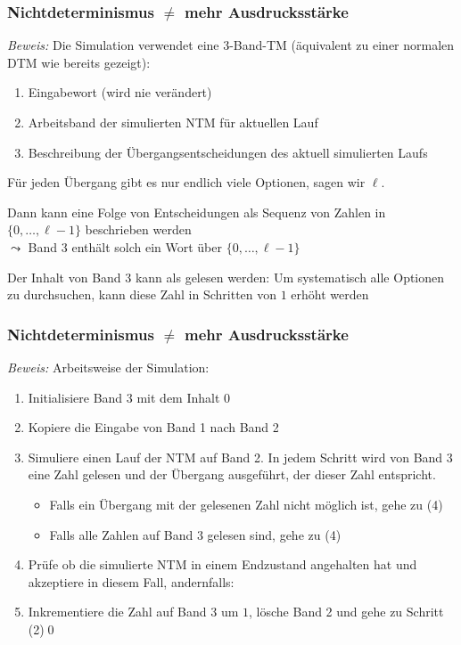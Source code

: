 \documentclass[aspectratio=1610,onlymath]{beamer}
\begin{document}
\begin{frame}[t]\frametitle{Nichtdeterminismus $\neq$ mehr Ausdrucksstärke}

\pause

\emph{Beweis:} Die Simulation verwendet eine 3-Band-TM (äquivalent zu einer normalen DTM wie bereits gezeigt):
\begin{enumerate}
\item Eingabewort (wird nie verändert)
\item Arbeitsband der simulierten NTM für aktuellen Lauf
\item Beschreibung der Übergangsentscheidungen des aktuell simulierten Laufs
\end{enumerate}\pause
Für jeden Übergang gibt es nur endlich viele Optionen, sagen wir $\ell$.\medskip\pause%

Dann kann eine Folge von Entscheidungen als Sequenz von Zahlen in $\{0,\ldots, \ell-1\}$ beschrieben werden\\
$\leadsto$ Band 3 enthält solch ein Wort über $\{0,\ldots, \ell-1\}$\medskip\pause%

Der Inhalt von Band 3 kann als  gelesen werden: Um systematisch alle Optionen
zu durchsuchen, kann diese Zahl in Schritten von $1$ erhöht werden

\end{frame}

\begin{frame}[t]\frametitle{Nichtdeterminismus $\neq$ mehr Ausdrucksstärke}


\emph{Beweis:} Arbeitsweise der Simulation:\pause
\begin{enumerate}[(1)]
\item Initialisiere Band 3 mit dem Inhalt $0$\pause
\item Kopiere die Eingabe von Band 1 nach Band 2\pause
\item Simuliere einen Lauf der NTM auf Band 2. In jedem Schritt wird von Band 3 eine Zahl gelesen
und der Übergang ausgeführt, der dieser Zahl entspricht.
\begin{itemize}
\item Falls ein Übergang mit der gelesenen Zahl nicht möglich ist, gehe zu (4)
\item Falls alle Zahlen auf Band 3 gelesen sind, gehe zu (4)
\end{itemize}\pause
\item Prüfe ob die simulierte NTM in einem Endzustand angehalten hat und akzeptiere in diesem Fall, andernfalls:
\item Inkrementiere die Zahl auf Band 3 um $1$, lösche Band 2 und gehe zu Schritt (2)\qed
\end{enumerate}

\end{frame}
\end{document}
